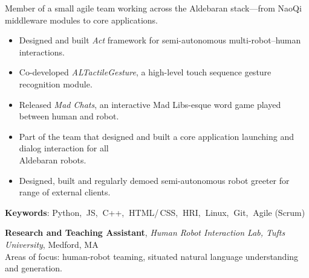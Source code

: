 \documentclass[10pt, letter]{article}
\newcommand{\years}[1]{\marginnote{\footnotesize #1}}
\newenvironment{desc*}{
  \begin{description}
    \setlength{\itemsep}{0.2pt}
    \setlength{\parskip}{-1pt}
    \setlength{\parsep}{0pt}
  }{
  \end{description}
}
\begin{document}
\vspace{-.3cm} 
Member of a small agile team working across the Aldebaran stack---from NaoQi middleware modules to core applications.
\begin{itemize}[leftmargin=*, parsep=-1pt]
\item Designed and built \textit{Act} framework for semi-autonomous
  multi-robot--human interactions.
\item Co-developed \textit{ALTactileGesture}, a high-level touch sequence
  gesture recognition module.
\item Released \textit{Mad Chats}, an interactive Mad Libs-esque word
  game played between human and robot.
\item Part of the team that designed and built a core
  application launching and dialog interaction for all\\
  Aldebaran robots.
\item Designed, built and regularly demoed semi-autonomous robot
  greeter for range of external clients.
\end{itemize}
\vspace{-.2cm}
\begin{desc*}
\item[\rm \color{redblue} \textbf{Keywords}:] Python,$\:$ JS,$\:$ C++,$\:$ HTML/\,CSS,$\:$
  HRI,$\:$ Linux,$\:$ Git,$\:$ Agile (Scrum)\\
\end{desc*}

\vspace{-.2cm}
\years{2012 - 2014} 
\textbf{\fontsize{10.5pt}{1em}\selectfont Research and Teaching Assistant}, 
\textit{Human Robot Interaction Lab, Tufts University}, Medford, MA\\ 

\vspace{-.3cm} 
Areas of focus: human-robot teaming, situated natural language understanding and generation. 

\vspace{-.3cm} 
\end{document}
